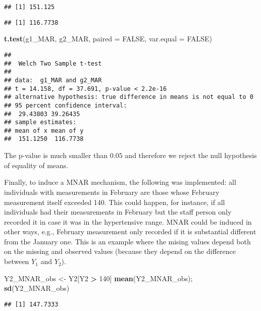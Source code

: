 \documentclass[
]{article}
\newenvironment{Shaded}{\begin{snugshade}}{\end{snugshade}}
\newcommand{\AttributeTok}[1]{\textcolor[rgb]{0.13,0.29,0.53}{#1}}
\newcommand{\ConstantTok}[1]{\textcolor[rgb]{0.56,0.35,0.01}{#1}}
\newcommand{\DecValTok}[1]{\textcolor[rgb]{0.00,0.00,0.81}{#1}}
\newcommand{\FunctionTok}[1]{\textcolor[rgb]{0.13,0.29,0.53}{\textbf{#1}}}
\newcommand{\NormalTok}[1]{#1}
\newcommand{\OtherTok}[1]{\textcolor[rgb]{0.56,0.35,0.01}{#1}}
\newcommand{\SpecialCharTok}[1]{\textcolor[rgb]{0.81,0.36,0.00}{\textbf{#1}}}
\begin{document}
\begin{verbatim}
## [1] 151.125
\end{verbatim}

\begin{verbatim}
## [1] 116.7738
\end{verbatim}

\begin{Shaded}
\begin{Highlighting}[]
\FunctionTok{t.test}\NormalTok{(g1\_MAR, g2\_MAR, }\AttributeTok{paired =} \ConstantTok{FALSE}\NormalTok{, }\AttributeTok{var.equal =} \ConstantTok{FALSE}\NormalTok{)}
\end{Highlighting}
\end{Shaded}

\begin{verbatim}
## 
##  Welch Two Sample t-test
## 
## data:  g1_MAR and g2_MAR
## t = 14.158, df = 37.691, p-value < 2.2e-16
## alternative hypothesis: true difference in means is not equal to 0
## 95 percent confidence interval:
##  29.43803 39.26435
## sample estimates:
## mean of x mean of y 
##  151.1250  116.7738
\end{verbatim}

The p-value is much smaller than \(0.05\) and therefore we reject the
null hypothesis of equality of means.

Finally, to induce a MNAR mechanism, the following was implemented: all
individuals with measurements in February are those whose February
measurement itself exceeded 140. This could happen, for instance, if all
individuals had their measurements in February but the staff person only
recorded it in case it was in the hypertensive range. MNAR could be
induced in other ways, e.g., February measurement only recorded if it is
substantial different from the January one. This is an example where the
mising values depend both on the missing and observed values (because
they depend on the difference between \(Y_1\) and \(Y_2\)).

\begin{Shaded}
\begin{Highlighting}[]
\NormalTok{Y2\_MNAR\_obs }\OtherTok{\textless{}{-}}\NormalTok{ Y2[Y2 }\SpecialCharTok{\textgreater{}} \DecValTok{140}\NormalTok{] }
\FunctionTok{mean}\NormalTok{(Y2\_MNAR\_obs); }\FunctionTok{sd}\NormalTok{(Y2\_MNAR\_obs)}
\end{Highlighting}
\end{Shaded}

\begin{verbatim}
## [1] 147.7333
\end{verbatim}
\end{document}
